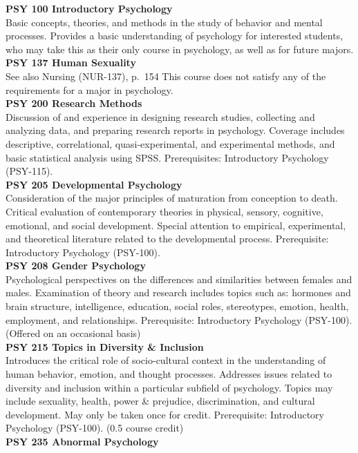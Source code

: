 \documentclass[
  letterpaper,
]{scrbook}
\begin{document}
\textbf{PSY 100 Introductory Psychology}\\
Basic concepts, theories, and methods in the study of behavior and
mental processes. Provides a basic understanding of psychology for
interested students, who may take this as their only course in
psychology, as well as for future majors.\\
\textbf{PSY 137 Human Sexuality}\\
See also Nursing (NUR-137), p.~154 This course does not satisfy any of
the requirements for a major in psychology.\\
\textbf{PSY 200 Research Methods}\\
Discussion of and experience in designing research studies, collecting
and analyzing data, and preparing research reports in psychology.
Coverage includes descriptive, correlational, quasi-experimental, and
experimental methods, and basic statistical analysis using SPSS.
Prerequisites: Introductory Psychology (PSY-115).\\
\textbf{PSY 205 Developmental Psychology}\\
Consideration of the major principles of maturation from conception to
death. Critical evaluation of contemporary theories in physical,
sensory, cognitive, emotional, and social development. Special attention
to empirical, experimental, and theoretical literature related to the
developmental process. Prerequisite: Introductory Psychology
(PSY-100).\\
\textbf{PSY 208 Gender Psychology}\\
Psychological perspectives on the differences and similarities between
females and males. Examination of theory and research includes topics
such as: hormones and brain structure, intelligence, education, social
roles, stereotypes, emotion, health, employment, and relationships.
Prerequisite: Introductory Psychology (PSY-100). (Offered on an
occasional basis)\\
\textbf{PSY 215 Topics in Diversity \& Inclusion}\\
Introduces the critical role of socio-cultural context in the
understanding of human behavior, emotion, and thought processes.
Addresses issues related to diversity and inclusion within a particular
subfield of psychology. Topics may include sexuality, health, power \&
prejudice, discrimination, and cultural development. May only be taken
once for credit. Prerequisite: Introductory Psychology (PSY-100). (0.5
course credit)\\
\textbf{PSY 235 Abnormal Psychology}\\
\end{document}
